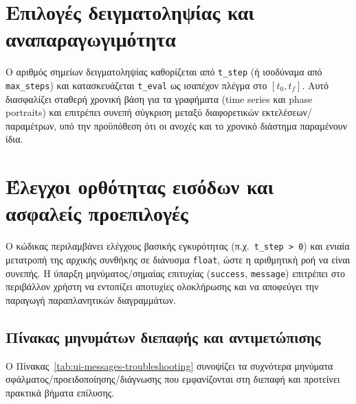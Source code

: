 \documentclass[11pt,a4paper]{report}
\begin{document}
\section{Επιλογές δειγματοληψίας και αναπαραγωγιμότητα}
\label{app:sampling}
Ο αριθμός σημείων δειγματοληψίας καθορίζεται από \texttt{t\_step} (ή ισοδύναμα από \texttt{max\_steps}) και κατασκευάζεται \texttt{t\_eval} ως ισαπέχον πλέγμα στο $[t_0,t_f]$.
Αυτό διασφαλίζει σταθερή χρονική βάση για τα γραφήματα (time series και phase portraits) και επιτρέπει συνεπή σύγκριση μεταξύ διαφορετικών εκτελέσεων/παραμέτρων, υπό την προϋπόθεση ότι οι ανοχές και το χρονικό διάστημα παραμένουν ίδια.

\section{Έλεγχοι ορθότητας εισόδων και ασφαλείς προεπιλογές}
\label{app:input-checks}
Ο κώδικας περιλαμβάνει ελέγχους βασικής εγκυρότητας (π.χ.\ \texttt{t\_step > 0}) και ενιαία μετατροπή της αρχικής συνθήκης σε διάνυσμα \texttt{float}, ώστε η αριθμητική ροή να είναι συνεπής.
Η ύπαρξη μηνύματος/σημαίας επιτυχίας (\texttt{success}, \texttt{message}) επιτρέπει στο περιβάλλον χρήστη να εντοπίζει αποτυχίες ολοκλήρωσης και να αποφεύγει την παραγωγή παραπλανητικών διαγραμμάτων.

\subsection*{Πίνακας μηνυμάτων διεπαφής και αντιμετώπισης}
\label{app:ui-messages}
Ο Πίνακας~\ref{tab:ui-messages-troubleshooting} συνοψίζει τα συχνότερα μηνύματα
σφάλματος/προειδοποίησης/διάγνωσης που εμφανίζονται στη διεπαφή και
προτείνει πρακτικά βήματα επίλυσης.
\end{document}
